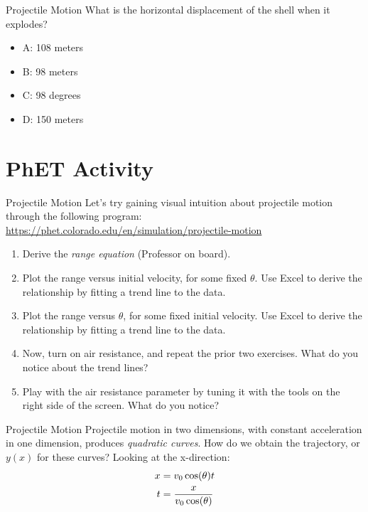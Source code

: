 \documentclass{beamer}
\begin{document}
\begin{frame}{Projectile Motion}
What is the horizontal displacement of the shell when it explodes?
\begin{itemize}
\item A: 108 meters
\item B: 98 meters
\item C: 98 degrees
\item D: 150 meters
\end{itemize}
\end{frame}

\section{PhET Activity}

\begin{frame}{Projectile Motion}
\small
Let's try gaining visual intuition about projectile motion through the following program: \\
\vspace{0.25cm}
\url{https://phet.colorado.edu/en/simulation/projectile-motion}\\
\begin{enumerate}
\item Derive the \textit{range equation} (Professor on board).
\item Plot the range versus initial velocity, for some fixed $\theta$.  Use Excel to derive the relationship by fitting a trend line to the data.
\item Plot the range versus $\theta$, for some fixed initial velocity.  Use Excel to derive the relationship by fitting a trend line to the data.
\item Now, turn on air resistance, and repeat the prior two exercises.  What do you notice about the trend lines?
\item Play with the air resistance parameter by tuning it with the tools on the right side of the screen.  What do you notice?
\end{enumerate}
\end{frame}

\begin{frame}{Projectile Motion}
Projectile motion in two dimensions, with constant acceleration in one dimension, produces \textit{quadratic curves}.  How do we obtain the \alert{trajectory}, or $y(x)$ for these curves?  Looking at the x-direction:\\
\begin{align}
x &= v_{\rm 0}\cos(\theta) t \\
t &= \frac{x}{v_{\rm 0} \cos(\theta)} \label{eq:subst}
\end{align}
\end{frame}
\end{document}
